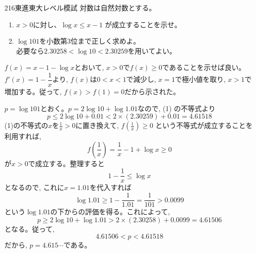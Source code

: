 \begin{prob}{216}{}{東進東大レベル模試}
 対数は自然対数とする。
 \begin{enumerate}
  \item $x>0$に対し、$\log x \le x-1$ が成立することを示せ。
  \item $\log 101$を小数第3位まで正しく求めよ。 \\ 必要なら$2.30258<\log 10 <2.30259$を用いてよい。
 \end{enumerate}
\end{prob}

$f(x)=x-1- \log{x} $とおいて, $x>0$で$f(x)\geq 0$であることを示せば良い。$f'(x) = 1- \dfrac{1}{x}$より, $f(x)$は$0<x<1$で減少し, $x=1$で極小値を取り, $x>1$で増加する。従って, $f(x)>f(1) = 0$だから示された。

$p=\log{101}$とおく。$p=2\log{10}+\log{1.01}$なので, (1) の不等式より
\[ p\leq 2\log{10}+ 0.01 < 2\times (2.30259) + 0.01 = 4.61518 \]
(1)の不等式の$x$を$\frac{1}{x}>0$に置き換えて, $f(\frac{1}{x})\geq 0$ という不等式が成立することを利用すれば, 
\[ f(\frac{1}{x})= \dfrac{1}{x}- 1 + \log{x} \geq 0 \]
が$x>0$で成立する。整理すると
\[ 1-\dfrac{1}{x}\leq \log{x} \]
となるので, これに$x=1.01$を代入すれば
\[ \log{1.01} \geq 1- \dfrac{1}{1.01} = \dfrac{1}{101} > 0.0099 \]
という$\log{1.01}$の下からの評価を得る。これによって, 
\[ p \geq 2\log{10} + \log{1.01}  > 2\times (2.30258) + 0.0099 =4.61506 \]
となる。従って,
\[ 4.61506 < p < 4.61518 \]
だから, $p= 4.615\cdots $である。
